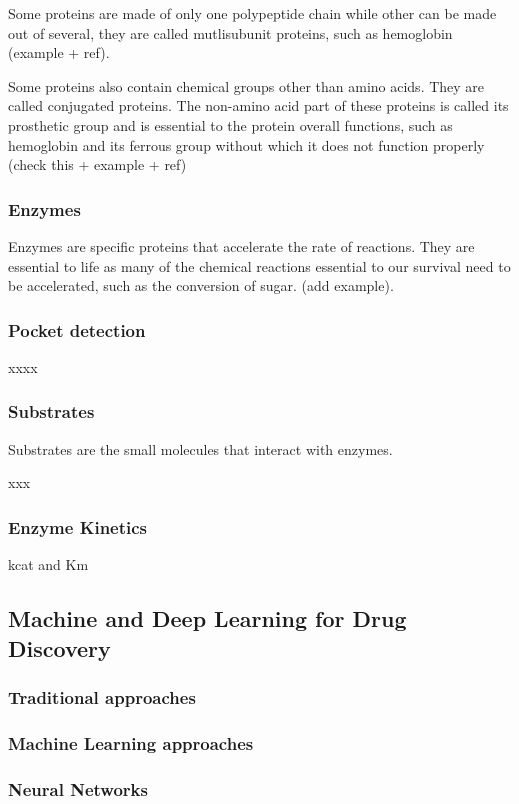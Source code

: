 Some proteins are made of only one polypeptide chain while other can be made out of several, they are 
called mutlisubunit proteins, such as hemoglobin (example + ref).

Some proteins also contain chemical groups other than amino acids. They are called conjugated proteins.
The non-amino acid part of these proteins is called its prosthetic group and is essential to the protein
overall functions, such as hemoglobin and its ferrous group without which it does not function properly 
(check this + example + ref)

\subsubsection{Enzymes}
Enzymes are specific proteins that accelerate the rate of reactions. They are essential to life as many
of the chemical reactions essential to our survival need to be accelerated, such as the conversion of sugar.
(add example). 

\subsubsection{Pocket detection}
xxxx


\subsubsection{Substrates}
Substrates are the small molecules that interact with enzymes.

xxx
\subsubsection{Enzyme Kinetics}
kcat and Km

\subsection{Machine and Deep Learning for Drug Discovery}
\subsubsection{Traditional approaches}
\subsubsection{Machine Learning approaches}
\subsubsection{Neural Networks}
